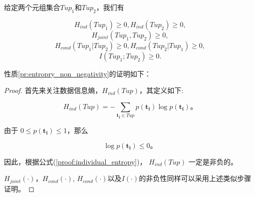 \begin{propt}[数据信息熵的非负性]
\label{pr:entropry_non_negativity}
给定两个元组集合$Tup_1$和$Tup_2$，我们有

\begin{equation}
  H_{ind}(Tup_1)\ge 0, H_{ind}(Tup_2)\ge 0,
\end{equation}
\begin{equation}
  H_{joint}(Tup_1,Tup_2)\ge 0,
\end{equation}
\begin{equation}
  H_{cond}(Tup_1|Tup_2)\ge 0, H_{cond}(Tup_2|Tup_1)\ge 0,
\end{equation}
\begin{equation}
  I(Tup_1;Tup_2)\ge 0.
\end{equation}


性质\ref{pr:entropry_non_negativity}的证明如下：
\begin{proof}
首先来关注数据信息熵，$H_{ind}(Tup)$，其定义如下:

\begin{equation}
    H_{ind}(Tup)=-\sum_{\bm{t_i} \in Tup}p(\bm{t_i})\log p(\bm{t_i})。
    \label{proof:individual_entropy}
\end{equation}

由于 $0\le p(\bm{t_i}) \le 1$，那么

\begin{equation}
\log p(\bm{t_i}) \le 0。
\end{equation}

因此，根据公式(\ref{proof:individual_entropy})， $H_{ind}(Tup)$ 一定是非负的。

$H_{joint}(\cdot)$，$H_{cond}(\cdot)$, $H_{cond}(\cdot)$以及$I(\cdot)$的非负性同样可以采用上述类似步骤证明。

\end{proof}
\end{propt}

